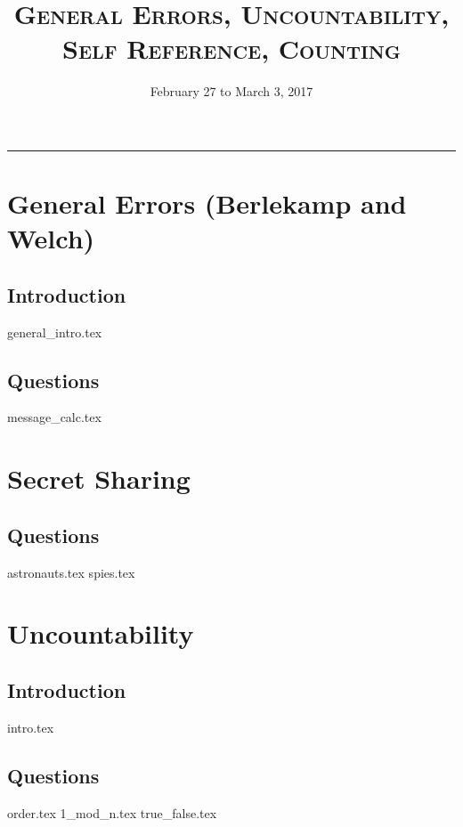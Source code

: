 \documentclass{exam}
\title{\textsc{General Errors, Uncountability, Self Reference, Counting}}
\date{February 27 to March 3, 2017}
\begin{document}
\maketitle
\rule{\textwidth}{0.15em}
\fontsize{12}{15}\selectfont
\thispagestyle{empty}

\section{General Errors (Berlekamp and Welch)}
\subsection{Introduction}
{general_intro.tex}
\subsection{Questions}
\begin{questions}
{message_calc.tex}
\end{questions}

\newpage

\section{Secret Sharing}
\subsection{Questions}
\begin{questions}
{astronauts.tex}
{spies.tex}
\end{questions}

\section{Uncountability}
\subsection{Introduction}
\begin{questions}
{intro.tex}
\end{questions}
\subsection{Questions}
\begin{questions}
{order.tex}
{1_mod_n.tex}
{true_false.tex}
\end{questions}
\end{document}
